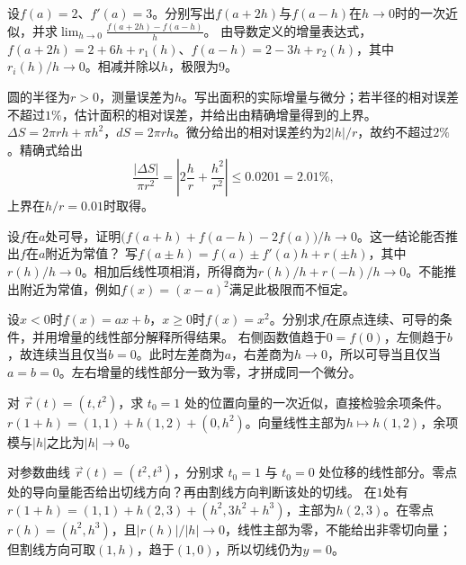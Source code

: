 设\(f(a)=2\)、\(f'(a)=3\)。分别写出\(f(a+2h)\)与\(f(a-h)\)在\(h\to0\)时的一次近似，并求\(\displaystyle\lim_{h\to0}\frac{f(a+2h)-f(a-h)}h\)。
\solutionanswer
由导数定义的增量表达式，\(f(a+2h)=2+6h+r_1(h)\)、\(f(a-h)=2-3h+r_2(h)\)，其中\(r_i(h)/h\to0\)。相减并除以\(h\)，极限为\(9\)。


圆的半径为\(r>0\)，测量误差为\(h\)。写出面积的实际增量与微分；若半径的相对误差不超过\(1\%\)，估计面积的相对误差，并给出由精确增量得到的上界。
\solutionanswer
\(\Delta S=2\pi rh+\pi h^2\)，\(dS=2\pi rh\)。微分给出的相对误差约为\(2|h|/r\)，故约不超过\(2\%\)。精确式给出
\[
 \frac{|\Delta S|}{\pi r^2}=\left|2\frac hr+\frac{h^2}{r^2}\right|
 \le0.0201=2.01\%,
\]
上界在\(h/r=0.01\)时取得。


设\(f\)在\(a\)处可导，证明\(\bigl(f(a+h)+f(a-h)-2f(a)\bigr)/h\to0\)。这一结论能否推出\(f\)在\(a\)附近为常值？
\solutionanswer
写\(f(a\pm h)=f(a)\pm f'(a)h+r(\pm h)\)，其中\(r(h)/h\to0\)。相加后线性项相消，所得商为\(r(h)/h+r(-h)/h\to0\)。不能推出附近为常值，例如\(f(x)=(x-a)^2\)满足此极限而不恒定。


设\(x<0\)时\(f(x)=ax+b\)，\(x\ge0\)时\(f(x)=x^2\)。分别求\(f\)在原点连续、可导的条件，并用增量的线性部分解释所得结果。
\solutionanswer
右侧函数值趋于\(0=f(0)\)，左侧趋于\(b\)，故连续当且仅当\(b=0\)。此时左差商为\(a\)，右差商为\(h\to0\)，所以可导当且仅当\(a=b=0\)。左右增量的线性部分一致为零，才拼成同一个微分。


对 \(\vec r(t)=(t,t^2)\)，求 \(t_0=1\) 处的位置向量的一次近似，直接检验余项条件。
\solutionanswer
\(r(1+h)=(1,1)+h(1,2)+(0,h^2)\)。向量线性主部为\(h\mapsto h(1,2)\)，余项模与\(|h|\)之比为\(|h|\to0\)。


对参数曲线 \(\vec r(t)=(t^2,t^3)\)，分别求 \(t_0=1\) 与 \(t_0=0\) 处位移的线性部分。零点处的导向量能否给出切线方向？再由割线方向判断该处的切线。
\solutionanswer
在\(1\)处有\(r(1+h)=(1,1)+h(2,3)+(h^2,3h^2+h^3)\)，主部为\(h(2,3)\)。在零点\(r(h)=(h^2,h^3)\)，且\(|r(h)|/|h|\to0\)，线性主部为零，不能给出非零切向量；但割线方向可取\((1,h)\)，趋于\((1,0)\)，所以切线仍为\(y=0\)。


